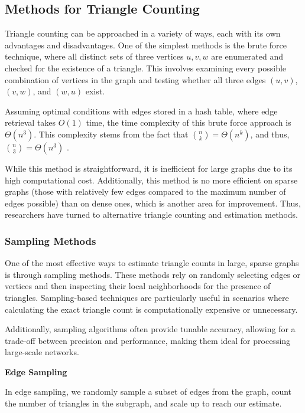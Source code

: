 \documentclass[11pt]{article}
\newcommand{\subsubsubsection}[1]{
  \vspace{1em} %
  \noindent\textbf{#1} %
  \vspace{0.5em} %
}
\begin{document}
\subsection{Methods for Triangle Counting}

Triangle counting can be approached in a variety of ways, each with its own advantages and disadvantages. 
One of the simplest methods is the brute force technique, where all distinct sets of three vertices ${u, v, w}$ are enumerated and checked for the existence of a triangle.
This involves examining every possible combination of vertices in the graph and testing whether all three edges $(u, v)$, $(v, w)$, and $(w, u)$ exist. 

Assuming optimal conditions with edges stored in a hash table, where edge retrieval takes $O(1)$ time, the time complexity of this brute force approach is $\Theta(n^3)$. 
This complexity stems from the fact that ${n \choose k} = \Theta(n^k)$, and thus, ${n \choose 3} = \Theta(n^3)$ \cite{al_hasan_triangle_2018}. 

While this method is straightforward, it is inefficient for large graphs due to its high computational cost.
Additionally, this method is no more efficient on sparse graphs (those with relatively few edges compared to the maximum number of edges possible) than on dense ones, which is another area for improvement.
Thus, researchers have turned to alternative triangle counting and estimation methods.

\subsubsection{Sampling Methods}

One of the most effective ways to estimate triangle counts in large, sparse graphs is through sampling methods.
These methods rely on randomly selecting edges or vertices and then inspecting their local neighborhoods for the presence of triangles.
Sampling-based techniques are particularly useful in scenarios where calculating the exact triangle count is computationally expensive or unnecessary.

Additionally, sampling algorithms often provide tunable accuracy, allowing for a trade-off between precision and performance, making them ideal for processing large-scale networks.

\subsubsubsection{Edge Sampling}

In edge sampling, we randomly sample a subset of edges from the graph, count the number of triangles in the subgraph, and scale up to reach our estimate.
\end{document}
